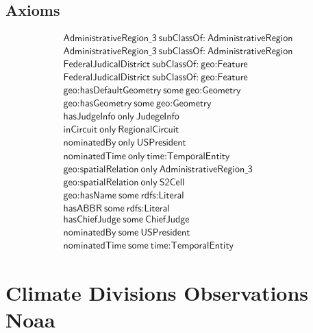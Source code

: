 \subsection{Axioms}
\begin{align}
  \textsf{AdministrativeRegion\_3}~\textsf{subClassOf:}~\textsf{AdministrativeRegion}\\
  \textsf{AdministrativeRegion\_3}~\textsf{subClassOf:}~\textsf{AdministrativeRegion}\\
  \textsf{FederalJudicalDistrict}~\textsf{subClassOf:}~\textsf{geo:Feature}\\
  \textsf{FederalJudicalDistrict}~\textsf{subClassOf:}~\textsf{geo:Feature}\\
  \textsf{geo:hasDefaultGeometry}~\textsf{some}~\textsf{geo:Geometry}\\
  \textsf{geo:hasGeometry}~\textsf{some}~\textsf{geo:Geometry}\\
  \textsf{hasJudgeInfo}~\textsf{only}~\textsf{JudegeInfo}\\
  \textsf{inCircuit}~\textsf{only}~\textsf{RegionalCircuit}\\
  \textsf{nominatedBy}~\textsf{only}~\textsf{USPresident}\\
  \textsf{nominatedTime}~\textsf{only}~\textsf{time:TemporalEntity}\\
  \textsf{geo:spatialRelation}~\textsf{only}~\textsf{AdministrativeRegion\_3}\\
  \textsf{geo:spatialRelation}~\textsf{only}~\textsf{S2Cell}\\
  \textsf{geo:hasName}~\textsf{some}~\textsf{rdfs:Literal}\\
  \textsf{hasABBR}~\textsf{some}~\textsf{rdfs:Literal}\\
  \textsf{hasChiefJudge}~\textsf{some}~\textsf{ChiefJudge}\\
  \textsf{nominatedBy}~\textsf{some}~\textsf{USPresident}\\
  \textsf{nominatedTime}~\textsf{some}~\textsf{time:TemporalEntity}\end{align}



\section{Climate Divisions Observations Noaa}
\label{sec:climate-divisions-observations-noaa}
